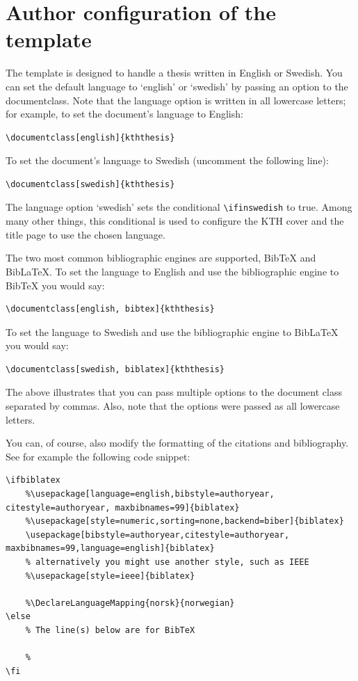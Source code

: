 \documentclass[main.tex]{subfiles}
\begin{document}
\section{Author configuration of the template}
\label{sec:authorConfigs}
The template is designed to handle a thesis written in English or Swedish.
You can set the default language to `english' or `swedish' by passing an option to the documentclass. Note that the language option is written in all lowercase letters; for example, to set the document's language to English:
\begin{lstlisting}[style=latexExampleForAuthors]
\documentclass[english]{kththesis}
\end{lstlisting}

To set the document's language to Swedish (uncomment the following line):
\begin{lstlisting}[style=latexExampleForAuthors]
\documentclass[swedish]{kththesis}
\end{lstlisting}

The language option `swedish' sets the conditional \texttt{\textbackslash ifinswedish} to true.  Among many other things, this conditional is used to configure the KTH cover and the title page to use the chosen language.

The two most common bibliographic engines are supported, \ie BibTeX and BibLaTeX. To set the language to English and use the bibliographic engine to BibTeX you would say:
\begin{lstlisting}[style=latexExampleForAuthors]
\documentclass[english, bibtex]{kththesis}
\end{lstlisting}
To set the language to Swedish and use the bibliographic engine to BibLaTeX you would say:
\begin{lstlisting}[style=latexExampleForAuthors]
\documentclass[swedish, biblatex]{kththesis}
\end{lstlisting}

The above illustrates that you can pass multiple options to the document class separated by commas. Also, note that the options were passed as all lowercase letters.

You can, of course, also modify the formatting of the citations and bibliography. See for example the following code snippet:

\begin{lstlisting}[style=latexExampleForAuthors]
\ifbiblatex
    %\usepackage[language=english,bibstyle=authoryear, citestyle=authoryear, maxbibnames=99]{biblatex}
    %\usepackage[style=numeric,sorting=none,backend=biber]{biblatex}
    \usepackage[bibstyle=authoryear,citestyle=authoryear, maxbibnames=99,language=english]{biblatex}
    % alternatively you might use another style, such as IEEE
    %\usepackage[style=ieee]{biblatex}
    
    %\DeclareLanguageMapping{norsk}{norwegian}
\else
    % The line(s) below are for BibTeX
    
    %
\fi
\end{lstlisting}
\end{document}

